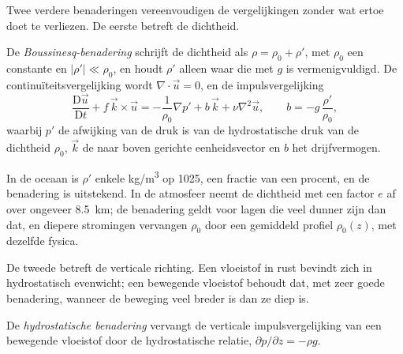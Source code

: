 \begin{omfigure}
\par{}\label{fig:b3:gfd-foundations:frame}
\end{omfigure}

Twee verdere benaderingen vereenvoudigen de vergelijkingen zonder wat ertoe doet te verliezen.
De eerste betreft de dichtheid.

\begin{definition}\label{def:b3:gfd-foundations:boussinesq}
De \emph{Boussinesq-benadering} schrijft
de dichtheid als $\rho = \rho_0 + \rho'$, met $\rho_0$ een constante en
$|\rho'| \ll \rho_0$, en houdt $\rho'$ alleen waar die met $g$ is vermenigvuldigd.
De continuïteitsvergelijking wordt $\nabla\cdot\vec u = 0$, en de
impulsvergelijking
\[
\frac{\mathrm D\vec u}{\mathrm Dt} + f\,\vec k\times\vec u =
-\frac{1}{\rho_0}\nabla p' + b\,\vec k + \nu\nabla^2\vec u ,
\qquad b = -g\,\frac{\rho'}{\rho_0} ,
\]
waarbij $p'$ de afwijking van de druk is van de hydrostatische druk
van de dichtheid $\rho_0$, $\vec k$ de naar boven gerichte eenheidsvector en $b$ het
drijfvermogen.
\end{definition}

In de oceaan is $\rho'$ enkele \unit{kg/m^3} op \num{1025}, een fractie van een
procent, en de benadering is uitstekend. In de atmosfeer neemt de dichtheid
met een factor $e$ af over ongeveer \qty{8.5}{km}; de benadering geldt voor
lagen die veel dunner zijn dan dat, en diepere stromingen vervangen $\rho_0$ door een
gemiddeld profiel $\rho_0(z)$, met dezelfde fysica.

De tweede betreft de verticale richting. Een vloeistof in rust bevindt zich in hydrostatisch
evenwicht; een bewegende vloeistof behoudt dat, met zeer goede benadering, wanneer de
beweging veel breder is dan ze diep is.

\begin{definition}\label{def:b3:gfd-foundations:hydrostatic}
De \emph{hydrostatische benadering}
vervangt de verticale impulsvergelijking van een bewegende vloeistof door de
hydrostatische relatie, $\partial p/\partial z = -\rho g$.
\end{definition}

